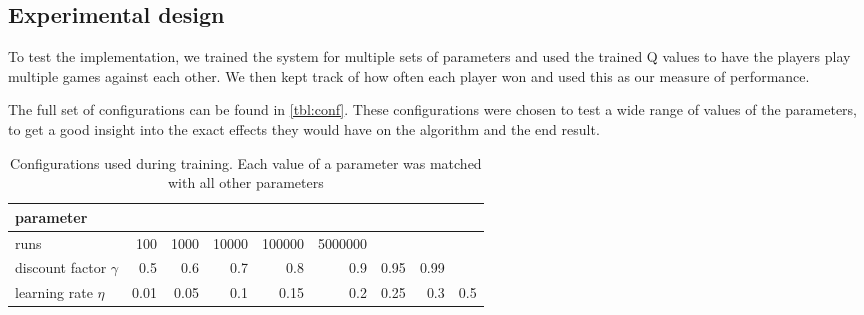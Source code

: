 \subsection{Experimental design}
To test the implementation, we trained the system for multiple sets of
parameters and used the trained Q values to have the players play multiple
games against each other. We then kept track of how often each player won
and used this as our measure of performance. 

The full set of configurations can be found in \autoref{tbl:conf}. These
configurations were chosen to test a wide range of values of the
parameters, to get a good insight into the exact effects they would have on
the algorithm and the end result. 

\begin{table}
    \centering
    \caption{Configurations used during training. Each value of a parameter
        was matched with all other parameters}
    \label{tbl:conf}
    \begin{tabular}{l|rrrrrrrr}
        \hline
        parameter & \\
        \hline
        runs & 100 & 1000 & 10000 & 100000 & 5000000 \\
        discount factor $\gamma$ & 0.5 & 0.6 & 0.7 & 0.8 & 0.9 & 0.95 &
        0.99 \\
        learning rate $\eta$ & 0.01 & 0.05 & 0.1 & 0.15 & 0.2 & 0.25 & 0.3
        & 0.5 \\
        \hline
    \end{tabular}
\end{table}
